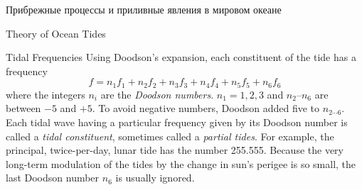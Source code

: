 \begin{chapter}{Прибрежные процессы и приливные явления в мировом океане}
\begin{section}{Theory of Ocean Tides}
\begin{paragraph}{Tidal Frequencies}
Using Doodson's expansion, each constituent of the tide has a
frequency
\begin{equation}
f = n_1 f_1 + n_2 f_2 + n_3 f_3 + n_4 f_4 + n_5 f_5 + n_6 f_6
\end{equation}
where the integers $n_i$ are the \textit{Doodson
numbers}. $n_1 = 1, 2, 3 $ and $n_2$--$n_6$ are between $-5$
and $+5$. To avoid negative numbers, Doodson added five to $n_{2
\cdots 6}$. Each tidal wave having a particular frequency given by its
Doodson number is called a \textit{tidal
constituent}, sometimes called a
\textit{partial tides}. For example, the
principal, twice-per-day, lunar tide has the number 255.555. Because
the very long-term modulation of the tides by the change in sun's
perigee is so small, the last Doodson number $n_6$ is usually ignored.
%


\end{paragraph}
\end{section}
\end{chapter}
